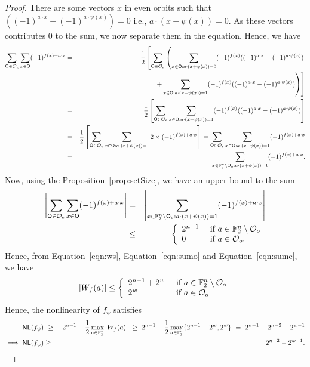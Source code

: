 \documentclass{llncs}
\begin{document}
\begin{proof}
There are some vectors $x$ in even orbits such that $((-1)^{ a \cdot x} - (-1)^{a \cdot \psi(x)}) = 0 $ i.e., $a \cdot (x + \psi(x))= 0$. As these vectors contributes $0$ to the sum, we now separate them in the equation. Hence, we have
\begin{eqnarray*}
\sum_{\mathsf{O} \in \mathcal{O}_e} \sum_{x \in \mathsf{O}} (-1)^{ f(x) + a \cdot x} 
& = & \frac{1}{2} \left[ \sum_{\mathsf{O} \in \mathcal{O}_e} \left( \sum_{x \in \mathsf{O} : a \cdot (x + \psi(x))= 0} (-1)^{f(x)} ((-1)^{ a \cdot x} - (-1)^{a \cdot \psi(x)})   \right. \right. \\
&& ~~~~~~~~~~~~~~~\left.  \left. +  \sum_{x \in \mathsf{O} : a \cdot (x + \psi(x))= 1 } (-1)^{f(x)} ((-1)^{ a \cdot x} - (-1)^{a \cdot \psi(x)})  \right) \right] \\
& = & \frac{1}{2} \left[ \sum_{\mathsf{O} \in \mathcal{O}_e} \sum_{x \in \mathsf{O} : a \cdot (x + \psi(x))= 1} (-1)^{f(x)} ((-1)^{ a \cdot x} - (-1)^{a \cdot \psi(x)})  \right] \\
& = & \frac{1}{2} \left[ \sum_{\mathsf{O} \in \mathcal{O}_e} \sum_{x \in \mathsf{O} : a \cdot (x + \psi(x))= 1 } 2 \times (-1)^{f(x)+ a \cdot x}  \right] = \sum_{\mathsf{O} \in \mathcal{O}_e} \sum_{x \in \mathsf{O} : a \cdot (x + \psi(x))= 1 } (-1)^{f(x)+ a \cdot x} \\
& = & \sum_{x \in \mathbb{F}_2^n\setminus \mathsf{O}_o : a \cdot (x + \psi(x))=1} (-1)^{f(x)+ a \cdot x}.
\end{eqnarray*}
Now, using the Proposition~\ref{prop:setSize}, we have an upper bound to the sum
\begin{eqnarray}
\left| \sum_{\mathsf{O} \in \mathcal{O}_e} \sum_{x \in \mathsf{O}} (-1)^{ f(x) + a \cdot x} \right| 
    & = & \left|\sum_{x \in \mathbb{F}_2^n\setminus \mathsf{O}_o : a \cdot (x + \psi(x))=1} (-1)^{f(x)+ a \cdot x}\right| \nonumber\\
    & \leq & \left\{
    \begin{array}{ll}
        2^{n-1} & \text{ if } a \in \mathbb{F}_2^n \setminus \mathcal{O}_o \\
        0           & \text{ if } a \in \mathcal{O}_o. \label{eqn:sume}
    \end{array}   \right.  
\end{eqnarray} 
Hence, from Equation~\ref{eqn:ws}, Equation~\ref{eqn:sumo} and Equation~\ref{eqn:sume}, we have
\begin{equation}\label{eqn:ws2}
|W_{f}(a)| \leq \left\{ \begin{array}{ll}
        2^{n-1} + 2^w & \text{ if } a \in \mathbb{F}_2^n \setminus \mathcal{O}_o \\
        2^w        & \text{ if } a \in \mathcal{O}_o
    \end{array}   \right. 
\end{equation}
Hence, the nonlinearity of $f_\psi$ satisfies
\begin{eqnarray*}
\mathsf{NL}(f_\psi) & ~\ge~ & 2^{n-1}-\frac{1}{2} \max_{a\in \mathbb{F}_2^n}| W_{f}(a)|
~\geq~ 2^{n-1}-\frac{1}{2} \max_{a\in \mathbb{F}_2^n} \{2^{n-1}+2^w,2^w \} ~=~ 2^{n-1} - 2^{n-2} - 2^{w-1} \\
\implies \mathsf{NL}(f_\psi) & \ge & 2^{n-2} - 2^{w-1}.
\end{eqnarray*}
\end{proof}
\end{document}
